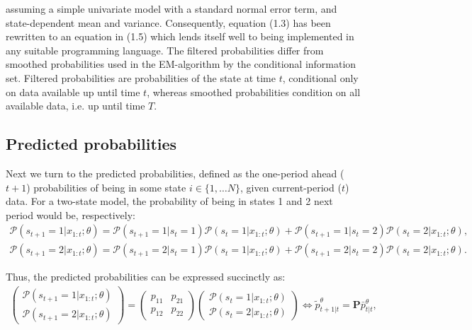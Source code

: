 \documentclass[11pt,a4paper,oneside]{article}
\newcommand{\LL}{\Leftrightarrow}
\newcommand{\lp}{\left(}
\newcommand{\rp}{\right)}
\newcommand{\pp}{\mathcal{P}}
\begin{document}
assuming a simple univariate model with a standard normal error term, and state-dependent mean and variance. Consequently, equation (1.3) has been rewritten to an equation in (1.5) which lends itself well to being implemented in any suitable programming language. The filtered probabilities differ from smoothed probabilities used in the EM-algorithm by the conditional information set. Filtered probabilities are probabilities of the state at time $t$, conditional only on data available up until time $t$, whereas smoothed probabilities condition on all available data, i.e. up until time $T$.

\subsection{Predicted probabilities}
Next we turn to the predicted probabilities, defined as the one-period ahead ($t+1$) probabilities of being in some state $i \in \{ 1, \dots N\}$, given current-period ($t$) data. For a two-state model, the probability of being in states 1 and 2 next period would be, respectively:
\begin{align*}
    \pp\lp s_{t+1} = 1\vert x_{1:t};\theta\rp = \pp\lp s_{t+1} = 1 \vert s_t = 1\rp \pp\lp s_t = 1 \vert x_{1:t}; \theta \rp + \pp\lp s_{t+1} = 1\vert s_t = 2\rp \pp\lp s_t = 2\vert x_{1:t};\theta\rp, \\
    \pp\lp s_{t+1} = 2\vert x_{1:t};\theta\rp = \pp\lp s_{t+1} = 2 \vert s_t = 1\rp \pp\lp s_t = 1 \vert x_{1:t}; \theta \rp + \pp\lp s_{t+1} = 2\vert s_t = 2\rp \pp\lp s_t = 2\vert x_{1:t};\theta\rp.
\end{align*}

Thus, the predicted probabilities can be expressed succinctly as:
\begin{align*}
    \begin{pmatrix}
        \pp\lp s_{t+1} = 1\vert x_{1:t};\theta\rp\\
        \pp\lp s_{t+1} = 2\vert x_{1:t};\theta\rp
    \end{pmatrix}
        =
    \begin{pmatrix}
        p_{11} & p_{21} \\
        p_{12} & p_{22}
    \end{pmatrix}
    \begin{pmatrix}
        \pp\lp s_t = 1 \vert x_{1:t};\theta \rp \\
        \pp\lp s_t = 2 \vert x_{1:t};\theta \rp
    \end{pmatrix}
    \LL
    \tilde p_{t+1\vert t}^\theta = \mathbf{P} \bar p_{t\vert t}^\theta,
\end{align*}
\end{document}
